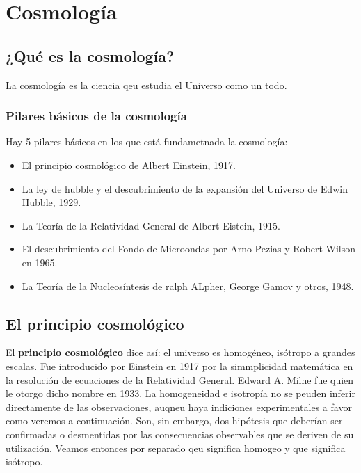 
\chapter{Cosmología}

\section{¿Qué es la cosmología?}

La cosmología es la ciencia qeu estudia el Universo como un todo.

\subsection{Pilares básicos de la cosmología}

Hay 5 pilares básicos en los que está fundametnada la cosmología:

\begin{itemize}
	\item El principio cosmológico de Albert Einstein, 1917.
	\item La ley de hubble y el descubrimiento de la expansión del Universo de Edwin Hubble, 1929.
	\item La Teoría de la Relatividad General de Albert Eistein, 1915.
	\item El descubrimiento del Fondo de Microondas por Arno Pezias y Robert Wilson en 1965.
	\item La Teoría de la Nucleosíntesis de ralph ALpher, George Gamov y otros, 1948.
\end{itemize}

\section{El principio cosmológico}

El \textbf{principio cosmológico} dice así: el universo es homogéneo, isótropo a grandes escalas. Fue introducido por Einstein en 1917 por la simmplicidad matemática en la resolución de ecuaciones de la Relatividad General. Edward A. Milne fue quien le otorgo dicho nombre en 1933. La homogeneidad e isotropía no se peuden inferir directamente de las observaciones, auqneu haya indiciones experimentales a favor como veremos a continuación. Son, sin embargo, dos hipótesis que deberían ser confirmadas o desmentidas por las consecuencias observables que se deriven de su utilización. Veamos entonces por separado qeu significa homogeo y que significa isótropo.


